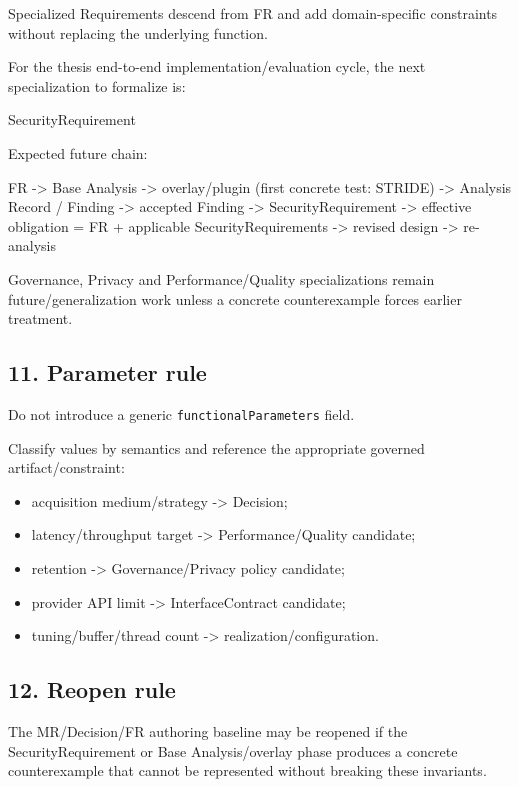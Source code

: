 \documentclass[
  10pt,
]{article}
\newenvironment{Shaded}{}{}
\newcommand{\NormalTok}[1]{#1}
\providecommand{\tightlist}{%
  \setlength{\itemsep}{0pt}\setlength{\parskip}{0pt}}
\begin{document}
Specialized Requirements descend from FR and add domain-specific
constraints without replacing the underlying function.

For the thesis end-to-end implementation/evaluation cycle, the next
specialization to formalize is:

\begin{Shaded}
\begin{Highlighting}[]
\NormalTok{SecurityRequirement}
\end{Highlighting}
\end{Shaded}

Expected future chain:

\begin{Shaded}
\begin{Highlighting}[]
\NormalTok{FR}
\NormalTok{  {-}\textgreater{} Base Analysis}
\NormalTok{  {-}\textgreater{} overlay/plugin (first concrete test: STRIDE)}
\NormalTok{  {-}\textgreater{} Analysis Record / Finding}
\NormalTok{  {-}\textgreater{} accepted Finding}
\NormalTok{  {-}\textgreater{} SecurityRequirement}
\NormalTok{  {-}\textgreater{} effective obligation = FR + applicable SecurityRequirements}
\NormalTok{  {-}\textgreater{} revised design}
\NormalTok{  {-}\textgreater{} re{-}analysis}
\end{Highlighting}
\end{Shaded}

Governance, Privacy and Performance/Quality specializations remain
future/generalization work unless a concrete counterexample forces
earlier treatment.

\subsection{11. Parameter rule}\label{11-parameter-rule}

Do not introduce a generic \texttt{functionalParameters} field.

Classify values by semantics and reference the appropriate governed
artifact/constraint:

\begin{itemize}
\tightlist
\item
  acquisition medium/strategy -\textgreater{} Decision;
\item
  latency/throughput target -\textgreater{} Performance/Quality
  candidate;
\item
  retention -\textgreater{} Governance/Privacy policy candidate;
\item
  provider API limit -\textgreater{} InterfaceContract candidate;
\item
  tuning/buffer/thread count -\textgreater{} realization/configuration.
\end{itemize}

\subsection{12. Reopen rule}\label{12-reopen-rule}

The MR/Decision/FR authoring baseline may be reopened if the
SecurityRequirement or Base Analysis/overlay phase produces a concrete
counterexample that cannot be represented without breaking these
invariants.
\end{document}
